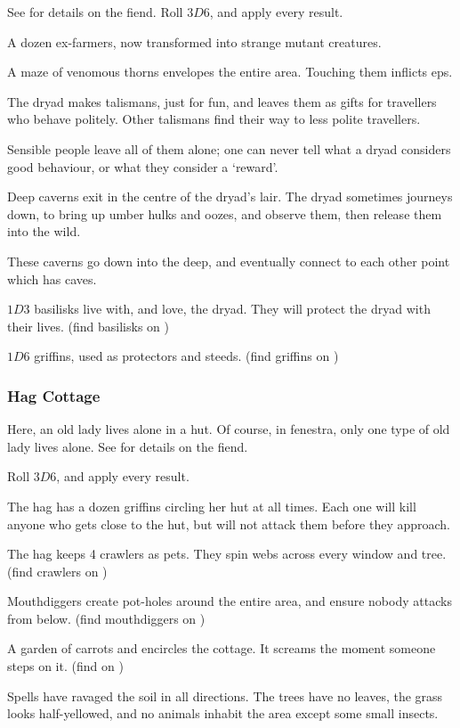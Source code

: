 \begin{multicols}{2}
See  for details on the fiend.
Roll $3D6$, and apply every result.

\begin{dlist}
  \item
  A dozen ex-farmers, now transformed into strange mutant creatures.
  \item
  A maze of venomous thorns envelopes the entire area.
  Touching them inflicts \glspl{ep}.
  \item
  The dryad makes \glspl{talisman}, just for fun, and leaves them as gifts for travellers who behave politely.
  Other \glspl{talisman} find their way to less polite travellers.

  Sensible people leave all of them alone; one can never tell what a dryad considers good behaviour, or what they consider a `reward'.
  \item
  Deep caverns exit in the centre of the dryad's lair.
  The dryad sometimes journeys down, to bring up umber hulks and oozes, and observe them, then release them into the wild.

  These caverns go down into the \gls{deep}, and eventually connect to each other point which has caves.
  \item
  $1D3$ \glspl{basilisk} live with, and love, the dryad.
  They will protect the dryad with their lives.
  (find \glspl{basilisk} on )
  \item
  $1D6$ griffins, used as protectors and steeds.
  (find griffins on )
\end{dlist}

\subsubsection{Hag Cottage}
\label{hagPoint}

Here, an old lady lives alone in a hut.
Of course, in \gls{fenestra}, only one type of old lady lives alone.
See  for details on the fiend.

Roll $3D6$, and apply every result.

\begin{dlist}
  \item
  The \gls{hag} has a dozen griffins circling her hut at all times.
  Each one will kill anyone who gets close to the hut, but will not attack them before they approach.
  \item
  The \gls{hag} keeps 4 \glspl{crawler} as pets.
  They spin webs across every window and tree.
  (find \glspl{crawler} on )
  \item
  Mouthdiggers create pot-holes around the entire area, and ensure nobody attacks from below.
  (find mouthdiggers on )
  \item
  A garden of carrots and  encircles the cottage.
  It screams the moment someone steps on it.
  (find  on )
  \item
  Spells have ravaged the soil in all directions.
  The trees have no leaves, the grass looks half-yellowed, and no animals inhabit the area except some small insects.


\end{dlist}
\end{multicols}
